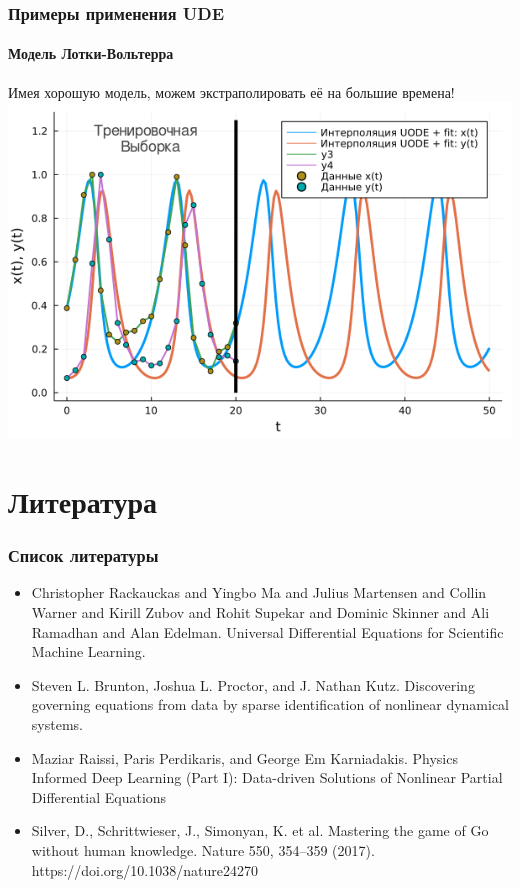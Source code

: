 \documentclass[10pt,pdf,hyperref={unicode}]{beamer}
\begin{document}
			\begin{frame}
				\frametitle{Примеры применения UDE} 
				\framesubtitle{Модель Лотки-Вольтерра}
				\begin{center}
					Имея хорошую модель, можем экстраполировать её на большие времена!
					\includegraphics[width=0.7\linewidth]{full_lotka.png}
				\end{center}
			\end{frame}
		
		
	\section*{Литература}
	
		\begin{frame}
			\frametitle{Список литературы} 
				\begin{itemize}
					\item Christopher Rackauckas and Yingbo Ma and Julius Martensen and Collin Warner and Kirill Zubov and Rohit Supekar and Dominic Skinner and Ali Ramadhan and Alan Edelman. Universal Differential Equations for Scientific Machine Learning.
					\item Steven L. Brunton, Joshua L. Proctor, and J. Nathan Kutz. Discovering governing equations from data by sparse identification of nonlinear dynamical systems. 
					\item Maziar Raissi, Paris Perdikaris, and George Em Karniadakis. Physics Informed Deep Learning (Part I): Data-driven Solutions of Nonlinear Partial Differential Equations
					\item Silver, D., Schrittwieser, J., Simonyan, K. et al. Mastering the game of Go without human knowledge. Nature 550, 354–359 (2017). https://doi.org/10.1038/nature24270
				\end{itemize}
			
		\end{frame}
\end{document}
